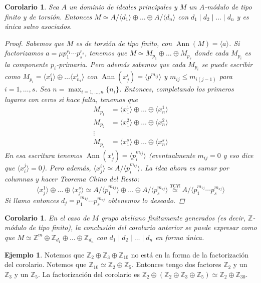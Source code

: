 \documentclass[12pt]{book}
\newtheorem{cor}[teo]{Corolario}
\theoremstyle{definition}
\newtheorem{ex}[teo]{Ejemplo}
\newcommand{\ZZ}{\mathbb{Z}}      %
\DeclareMathOperator{\ann}{Ann}
\begin{document}
\begin{cor}
Sea $A$ un dominio de ideales principales y $M$ un $A$-módulo de tipo finito y de torsión. Entonces $M\simeq A/\langle d_1\rangle \oplus\ldots \oplus A/\langle d_n\rangle$ con $d_1\mid d_2\mid \ldots \mid d_n$ y es única salvo asociados.
\begin{proof}
Sabemos que $M$ es de torsión de tipo finito, con $\ann(M) = \langle a\rangle$. Si factorizamos $a=\mu p_1^{r_1}\cdots p_s^{r_s}$, tenemos que $M\simeq M_{p_1}\oplus\ldots\oplus M_{p_s}$ donde cada $M_{p_i}$ es la componente $p_i$-primaria. Pero además sabemos que cada $M_{p_i}$ se puede escribir como $M_{p_i} = \langle x_1^i\rangle \oplus\ldots\langle x_{n_i}^i \rangle$ con $\ann(x_j^i)=\langle p^{m_{ij}}\rangle$ y $m_{ij}\leq m_{i(j-1)}$ para $i=1,\ldots , s$. Sea $n=\max_{i=1,\ldots , n}\{n_i\}$. Entonces, completando los primeros lugares con ceros si hace falta, tenemos que \begin{align*}M_{p_1} &= \langle x_1^1 \rangle \oplus \ldots \oplus \langle x_n^1 \rangle \\ M_{p_2} &= \langle x_1^2\rangle \oplus \ldots \oplus\langle x_n^2\rangle \\ \vdots\quad& \\ M_{p_s} &= \langle x_1^s\rangle\oplus\ldots\oplus \langle x_n^s\rangle \end{align*}
En esa escritura tenemos $\ann(x_j^i) = \langle p_i^{m_{ij}}\rangle$ (eventualmente $m_{ij}=0$ y eso dice que $\langle x_i^j\rangle =0$).
Pero además, $\langle x_j^i\rangle \simeq A/\langle p_i^{m_{ij}}\rangle$. La idea ahora es sumar por columnas y hacer Teorema Chino del Resto:
$$\langle x_j^1\rangle\oplus\ldots\oplus\langle x_j^s\rangle\simeq A/\langle p_1^{m_{1j}}\rangle \oplus\ldots \oplus A/\langle p_s^{m_{sj}}\rangle \stackrel{TCR}{\simeq} A/\langle p_1^{m_{1j}}\cdots p_s^{m_{sj}}\rangle$$ Si llamo entonces $d_j = p_1^{m_{1j}}\cdots p_s^{m_{sj}}$ obtenemos lo deseado.

\end{proof}
\end{cor}

\begin{cor}
En el caso de $M$ grupo abeliano finitamente generados (es decir, $\ZZ$-módulo de tipo finito), la conclusión del corolario anterior se puede expresar como que $M\simeq \ZZ^m \oplus \ZZ_{d_1}\oplus\ldots \oplus \ZZ_{d_n}$ con $d_1\mid d_2\mid\ldots \mid d_n$ en forma única.
\end{cor}

\begin{ex}
Notemos que $\ZZ_{2}\oplus \ZZ_3\oplus\ZZ_{10}$ no está en la forma de la factorización del corolario. Notemos que $\ZZ_{10}\simeq \ZZ_{2}\oplus\ZZ_5$. Entonces tengo dos factores $\ZZ_2$ y un $\ZZ_3$ y un $\ZZ_5$. La factorización del corolario es $\ZZ_2 \oplus (\ZZ_2\oplus \ZZ_3\oplus \ZZ_5) \simeq \ZZ_2 \oplus \ZZ_{30}$.
\end{ex}
\end{document}

